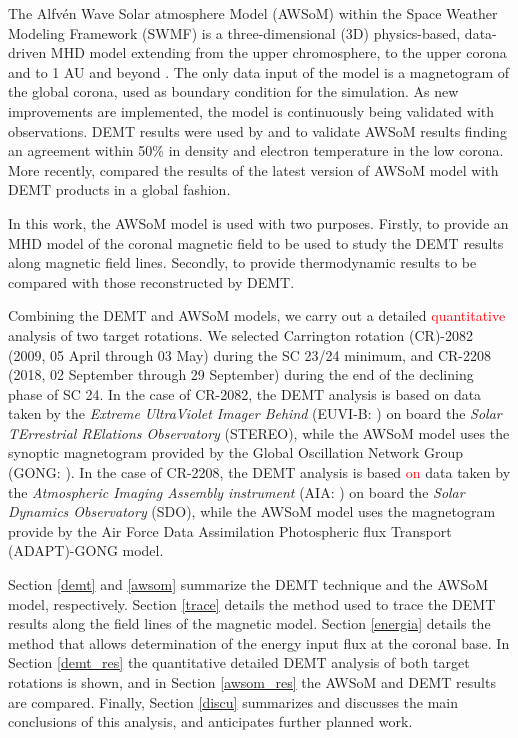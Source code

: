 \documentclass[namedreferences]{solarphysics}
\def\edit#1{\textcolor{Red}{#1}}
\begin{document}
\begin{article}
The Alfv\'{e}n Wave Solar atmosphere Model (AWSoM) within the Space Wea\-ther Modeling Framework (SWMF) is a three-dimensional (3D) physics-based, data-driven MHD model extending from the upper chromosphere, to the upper corona and to {1 AU and beyond} \citep{vander_2010, Van2014}. {The only data input of the model is a magnetogram of the global corona, used as boundary condition for the simulation. As new improvements are implemented, the model is continuously being validated with observations.} DEMT results were used by \citet{jin_2012} and \citet{oran_2015} to validate AWSoM results finding an agreement within 50\% in density and electron temperature in the low corona. More recently, \citet{sachdeva_2019} compared the results of the latest version of AWSoM model with DEMT products in a global fashion. 

{In this work, the AWSoM model is used with two purposes. Firstly, to provide an MHD model of the coronal magnetic field to be used to study the DEMT results along magnetic field lines. Secondly, to provide thermodynamic results to be compared with those reconstructed by DEMT.}

{Combining the DEMT and AWSoM models, we carry out a detailed \edit{quantitative} analysis of two target rotations. We selected Carrington rotation} (CR)-2082 (2009, 05 April through 03 May) during the SC 23/24 minimum, and CR-2208 (2018, 02 September through 29 September) during {the end of the declining} phase of SC 24. {In the case of CR-2082, the DEMT analysis is based on data} taken by the \textit{Extreme UltraViolet Imager Behind} {(EUVI-B: \citealt{wuelser_2004})} on board the \textit{Solar TErrestrial RElations Observatory} {(STEREO), while the AWSoM model uses the synoptic magnetogram provided by the Global Oscillation Network Group (GONG: \citealt{gong}). In the case of CR-2208, the DEMT analysis is based \edit{on} data taken} by the \textit{Atmospheric Imaging Assembly instrument} {(AIA: \citealt{lemen_2012})} on board the \textit{Solar Dynamics Observatory} {(SDO), while the AWSoM model uses the magnetogram provide by the Air Force Data Assimilation Photospheric flux Transport (ADAPT)-GONG model.}

Section \ref{demt} and \ref{awsom} {summarize the DEMT technique and the AWSoM model, respectively.} Section \ref{trace} {details} the method used to trace {the DEMT} results along the field lines of the magnetic model. Section \ref{energia} details {the method that allows determination of the energy input flux at the coronal base.} In Section \ref{demt_res} the quantitative {detailed DEMT analysis of both target rotations is shown,} and in Section \ref{awsom_res} the AWSoM and DEMT results are compared. {Finally, Section} \ref{discu} summarizes and discusses the main conclusions of this analysis, and anticipates further planned work. 


\end{article}
\end{document}
